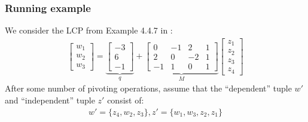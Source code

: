 \documentclass{article}
\newcommand{\1}{(\textos{1})\!}
\newcommand{\2}{(\textos{2})\!}
\newcommand{\3}{(\textos{3})\!}
\newcommand{\4}{(\textos{4})\!}
\newcommand{\5}{(\textos{5})\!}
\newcommand{\6}{(\textos{6})\!}
\newcommand{\7}{(\textos{7})\!}
\newcommand{\8}{(\textos{8})\!}
\begin{document}
\subsubsection{Running example} 
We consider the LCP from Example 4.4.7 in \cite{Cottle:1992}:
\begin{align*}
	\begin{bmatrix} w_1 \\ w_2 \\ w_3\end{bmatrix} = \underbrace{\begin{bmatrix}-3 \\ 6 \\ -1\end{bmatrix}}_{q} + \underbrace{\begin{bmatrix}  0 & -1 & 2 & 1\\ 2 & 0 & -2 & 1 \\ -1 & 1 & 0 & 1\end{bmatrix}}_{M}\begin{bmatrix}z_1 \\ z_2 \\ z_3 \\ z_4\end{bmatrix}
\end{align*}
After some number of pivoting operations, assume that the ``dependent'' tuple $w'$ and ``independent'' tuple $z'$ consist of:
\begin{align}
	w' = \{ z_4, w_2, z_3 \} ,
	z' = \{ w_1, w_3, z_2, z_1 \} 
    \tag{1} %
\end{align}
\end{document}
